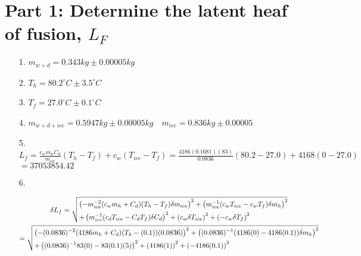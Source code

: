 ﻿\documentclass[12pt, letterpaper]{article}
\begin{document}
    \section*{Part 1: Determine the latent heaf of fusion, $L_{F}$}



    \begin{enumerate}
        \item [1.] $m_{w+d} = 0.343kg \pm 0.00005kg$
        \item [2.] $T_{h} = 80.2^{\circ}C \pm 3.5^{\circ}C$
        \item [3.] $T_{f} = 27.0^{\circ}C \pm 0.1^{\circ}C$
        \item [4.] $m_{w+d+ice} = 0.5947kg \pm 0.00005kg \quad m_{ice} = 0.836kg \pm 0.00005$
        \item [5.] $L_{f} = \frac{c_{w}m_{w}C_{d}}{m_{ice}}(T_{h}-T_{f})+c_{w}(T_{ice}-T_{f}) = \frac{4186(0.1681)(83)}{0.0836}(80.2-27.0)+4168(0-27.0)$ 
                   $= \boxed{37053854.42}$
        \item [6.] \mbox{}
        \begin{mdframed}
            \begin{equation*}
                \begin{gathered}
                    \delta L_{f} = \sqrt{ \begin{lgathered}
                        \left(-m_{ice}^{-2}(c_{w}m_{h}+C_{d})(T_{h}-T_{f})\delta m_{ice}\right)^{2} +
                        \left(m_{ice}^{-1}(c_{w}T_{ice} - c_{w}T_{f})\delta m_{h}\right)^{2} \\ +
                        \left(m_{ice}^{-1}(c_{d}T_{ice} - C_{d}T_{f})\delta C_{d}\right)^{2} +
                        \left(c_{w}\delta T_{ice}\right)^{2} +
                        \left(-c_{w}\delta T_{f}\right)^{2}
                    \end{lgathered}} \\
                    = \sqrt{ \begin{lgathered}
                        \left(-(0.0836)^{-2}(4186m_{h}+C_{d})(T_{h}-(0.1))(0.0836)\right)^{2} +
                        \left((0.0836)^{-1}(4186(0) - 4186(0.1))\delta m_{h}\right)^{2} \\ +
                        \left((0.0836)^{-1}83(0) - 83(0.1)(5)\right)^{2} +
                        \left(4186(1)\right)^{2} +
                        \left(-4186(0.1)\right)^{2}
                    \end{lgathered}} \\
                \end{gathered}
            \end{equation*}    
        \end{mdframed}
        
    \end{enumerate}
\end{document}
